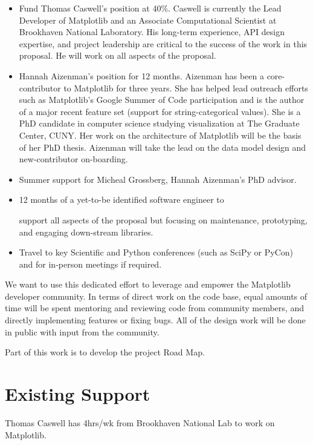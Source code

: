 \documentclass[11pt,letterpaper]{article}  %
\begin{document}
\begin{itemize}[noitemsep]

\item Fund Thomas Caswell's position at 40\%.  Caswell is
  currently the Lead Developer of Matplotlib and an Associate
  Computational Scientist at Brookhaven National Laboratory.  His
  long-term experience, API design expertise, and project leadership
  are critical to the success of the work in this proposal.  He will work
  on all aspects of the proposal.
\item Hannah Aizenman's position for 12 months.  Aizenman has
  been a core-contributor to Matplotlib for three years. She has helped lead outreach efforts such as
  Matplotlib's Google Summer of Code participation and is the author of a major recent feature set
  (support for string-categorical values).
  She is a PhD candidate in computer science studying visualization at The
  Graduate Center, CUNY.  Her work on the architecture of
  Matplotlib will be the basis of her PhD thesis.  Aizenman will take
  the lead on the data model design and new-contributor on-boarding.
\item Summer support for Micheal Grossberg, Hannah Aizenman's PhD advisor.
\item 12 months of a yet-to-be identified software engineer to

  support all aspects of the proposal but focusing on maintenance,
  prototyping, and engaging down-stream libraries.
\item Travel to key Scientific and Python conferences (such as SciPy
  or PyCon) and for in-person meetings if required.
\end{itemize}

We want to use this dedicated effort to leverage and empower the
Matplotlib developer community.  In terms of direct work on the code
base, equal amounts of time will be spent mentoring and reviewing
code from community members, and directly implementing features
or fixing bugs.  All of the design work will be done in public with
input from the community.

Part of this work is to develop the project Road Map.



\section{Existing Support}

Thomas Caswell has 4hrs/wk from Brookhaven National Lab to work on
Matplotlib.


\clearpage

\end{document}
